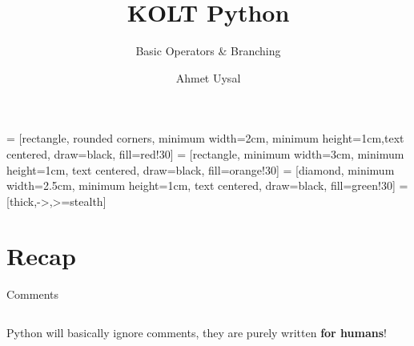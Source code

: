 

\usepackage{../KU-Beamer-Template/style/koc} 
\usepackage{minted}
\usepackage{upquote}
\usepackage{tikz}
\usetikzlibrary{shapes.geometric, arrows}
 = [rectangle, rounded corners, minimum width=2cm, minimum height=1cm,text centered, draw=black, fill=red!30]
 = [rectangle, minimum width=3cm, minimum height=1cm, text centered, draw=black, fill=orange!30]
 = [diamond, minimum width=2.5cm, minimum height=1cm, text centered, draw=black, fill=green!30]
 = [thick,->,>=stealth]

\title{KOLT Python} 
\subtitle{Basic Operators \& Branching} 
\date{}
\author{Ahmet Uysal}




    \maketitle

    \section{Recap}

        \begin{frame}{Comments}
            \LARGE
            \inputminted[frame=single,framesep=2pt]{python3}{../Lecture1/code-examples/comments.py}
            Python will basically ignore comments, they are purely written \textbf{for humans}!
        \end{frame}


